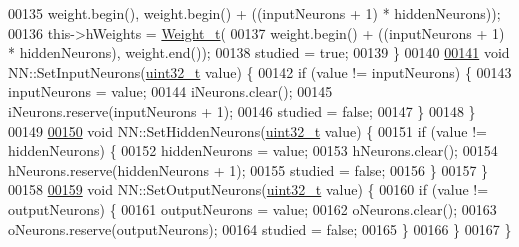\begin{DoxyCode}
00135       weight.begin(), weight.begin() + ((inputNeurons + 1) * hiddenNeurons));
00136   this->hWeights = \hyperlink{_soil_math_types_8h_ac56ad2b88186620fd0de0d213aa715dd}{Weight\_t}(
00137       weight.begin() + ((inputNeurons + 1) * hiddenNeurons), weight.end());
00138   studied = \textcolor{keyword}{true};
00139 \}
00140 
\hypertarget{_n_n_8cpp_source_l00141}{}\hyperlink{class_soil_math_1_1_n_n_a3a08c0f82d5f57895ccd28ae0a6274a3}{00141} \textcolor{keywordtype}{void} NN::SetInputNeurons(\hyperlink{_soil_math_types_8h_a435d1572bf3f880d55459d9805097f62}{uint32\_t} value) \{
00142   \textcolor{keywordflow}{if} (value != inputNeurons) \{
00143     inputNeurons = value;
00144     iNeurons.clear();
00145     iNeurons.reserve(inputNeurons + 1);
00146     studied = \textcolor{keyword}{false};
00147   \}
00148 \}
00149 
\hypertarget{_n_n_8cpp_source_l00150}{}\hyperlink{class_soil_math_1_1_n_n_ad4fd78afb9c34634464548c0196d2346}{00150} \textcolor{keywordtype}{void} NN::SetHiddenNeurons(\hyperlink{_soil_math_types_8h_a435d1572bf3f880d55459d9805097f62}{uint32\_t} value) \{
00151   \textcolor{keywordflow}{if} (value != hiddenNeurons) \{
00152     hiddenNeurons = value;
00153     hNeurons.clear();
00154     hNeurons.reserve(hiddenNeurons + 1);
00155     studied = \textcolor{keyword}{false};
00156   \}
00157 \}
00158 
\hypertarget{_n_n_8cpp_source_l00159}{}\hyperlink{class_soil_math_1_1_n_n_a3fc439de707dde0ba6a55d2941bd898b}{00159} \textcolor{keywordtype}{void} NN::SetOutputNeurons(\hyperlink{_soil_math_types_8h_a435d1572bf3f880d55459d9805097f62}{uint32\_t} value) \{
00160   \textcolor{keywordflow}{if} (value != outputNeurons) \{
00161     outputNeurons = value;
00162     oNeurons.clear();
00163     oNeurons.reserve(outputNeurons);
00164     studied = \textcolor{keyword}{false};
00165   \}
00166 \}
00167 \}
\end{DoxyCode}
